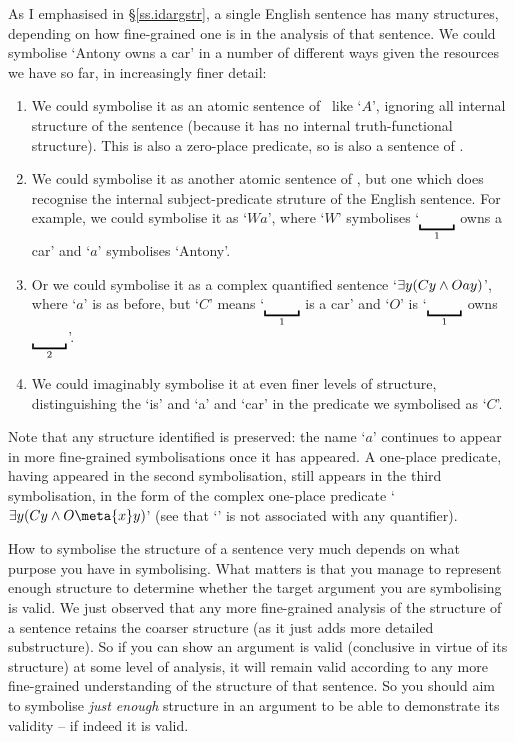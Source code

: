 As I emphasised in §\ref{ss.idargstr}, a single English sentence has many structures, depending on how fine-grained one is in the analysis of that sentence. We could symbolise `Antony owns a car' in a number of different ways given the resources we have so far, in increasingly finer detail: \begin{enumerate}
	\item We could symbolise it as an atomic sentence of \TFL\ like `$A$', ignoring all internal structure of the sentence (because it has no internal truth-functional structure). This is also a zero-place predicate, so is also a sentence of \FOL. 
	\item We could symbolise it as another atomic sentence of \FOL, but one which does recognise the internal subject-predicate struture of the English sentence. For example, we could symbolise it as `$Wa$', where `$W$' symbolises `$\gap{1}$ owns a car' and `$a$' symbolises `Antony'.
	\item Or we could symbolise it as a complex quantified sentence `$\exists y (Cy \wedge Oay)$', where `$a$' is as before, but `$C$' means `$\gap{1}$ is a car' and `$O$' is `$\gap{1}$ owns $\gap{2}$'.
	\item We could imaginably symbolise it at even finer levels of structure, distinguishing the `is' and `a' and `car' in the predicate we symbolised as `$C$'.
\end{enumerate} Note that any structure identified is preserved: the name `$a$' continues to appear in more fine-grained symbolisations once it has appeared. A one-place predicate, having appeared in the second symbolisation, still appears in the third symbolisation, in the form of the complex one-place predicate `$\exists y (Cy \eand O\meta{x}y)$' (see that `' is not associated with any quantifier).

How to symbolise the structure of a sentence very much depends on what purpose you have in symbolising. What matters is that you manage to represent enough structure to determine whether the target argument you are symbolising is valid. We just observed that any more fine-grained analysis of the structure of a sentence retains the coarser structure (as it just adds more detailed substructure). So if you can show an argument is valid (conclusive in virtue of its structure) at some level of analysis, it will remain valid according to any more fine-grained understanding of the structure of that sentence. So you should aim to symbolise \emph{just enough} structure in an argument to be able to demonstrate its validity – if indeed it is valid.

